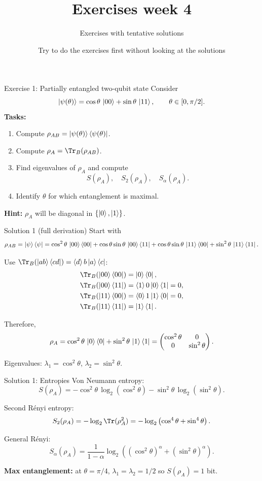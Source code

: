 \documentclass[aspectratio=169]{beamer}
\title{Exercises week 4}
\subtitle{Exercises with tentative solutions}
\author{Try to do the exercises first without looking at the solutions}
\institute{}
\date{}
\begin{document}
\begin{frame}
  \titlepage
\end{frame}


\begin{frame}{Exercise 1: Partially entangled two-qubit state}
Consider
\[
\ket{\psi(\theta)}=\cos\theta\,\ket{00}+\sin\theta\,\ket{11},\qquad \theta\in[0,\pi/2].
\]
\textbf{Tasks:}
\begin{enumerate}
\item Compute $\rho_{AB}=\ket{\psi(\theta)}\bra{\psi(\theta)}$.
\item Compute $\rho_A=\Tr_B(\rho_{AB})$.
\item Find eigenvalues of $\rho_A$ and compute
\[
S(\rho_A),\quad S_2(\rho_A),\quad S_\alpha(\rho_A).
\]
\item Identify $\theta$ for which entanglement is maximal.
\end{enumerate}

\medskip
\textbf{Hint:} $\rho_A$ will be diagonal in $\{\ket{0},\ket{1}\}$.
\end{frame}

\begin{frame}{Solution 1 (full derivation)}
Start with
\[
\rho_{AB}=\ket{\psi}\bra{\psi}=
\cos^2\theta\,\ket{00}\bra{00}
+\cos\theta\sin\theta\,\ket{00}\bra{11}
+\cos\theta\sin\theta\,\ket{11}\bra{00}
+\sin^2\theta\,\ket{11}\bra{11}.
\]

Use $\Tr_B(\ket{ab}\bra{cd})=\braket{d}{b}\ket{a}\bra{c}$:
\begin{align}
\Tr_B(\ket{00}\bra{00})&=\ket{0}\bra{0},\\
\Tr_B(\ket{00}\bra{11})&=\braket{1}{0}\ket{0}\bra{1}=0,\\
\Tr_B(\ket{11}\bra{00})&=\braket{0}{1}\ket{1}\bra{0}=0,\\
\Tr_B(\ket{11}\bra{11})&=\ket{1}\bra{1}.
\end{align}

Therefore,
\[
\rho_A=\cos^2\theta\,\ket{0}\bra{0}+\sin^2\theta\,\ket{1}\bra{1}
=\begin{pmatrix}
\cos^2\theta & 0\\
0 & \sin^2\theta
\end{pmatrix}.
\]

Eigenvalues: $\lambda_1=\cos^2\theta$, $\lambda_2=\sin^2\theta$.
\end{frame}

\begin{frame}{Solution 1: Entropies}
Von Neumann entropy:
\[
S(\rho_A)=-\cos^2\theta\,\log_2(\cos^2\theta)-\sin^2\theta\,\log_2(\sin^2\theta).
\]

Second Rényi entropy:
\[
S_2(\rho_A)=-\log_2\Tr(\rho_A^2)
=-\log_2\left(\cos^4\theta+\sin^4\theta\right).
\]

General Rényi:
\[
S_\alpha(\rho_A)=\frac{1}{1-\alpha}\log_2\left((\cos^2\theta)^\alpha+(\sin^2\theta)^\alpha\right).
\]

\medskip
\textbf{Max entanglement:} at $\theta=\pi/4$,
$\lambda_1=\lambda_2=1/2$ so $S(\rho_A)=1$ bit.
\end{frame}
\end{document}

